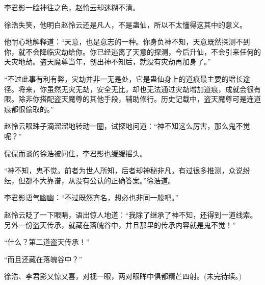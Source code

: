 \begin{this_body}
李君影一脸神往之色，赵怜云却迷糊不清。

徐浩失笑，他明白赵怜云还是凡人，不是蛊仙，所以不太懂得这其中的意义。

他耐心地解释道：“天意，也是意志的一种。你身负神不知，天意既然探测不到你，就不会降临灾劫给你。你已经逃离了天意的探测，今后升仙，不会引来任何的天灾地劫。盗天魔尊当年，创出神不知后，就没有灾劫再加身了。”

“不过此事有利有弊，灾劫并非一无是处，它是蛊仙身上的道痕最主要的增长途径。将来，你虽然无灾无劫，安全无比，却也无法通过灾劫增加道痕，成就会很有限。除非你搭配盗天魔尊的其他手段，辅助修行。历史记载中，盗天魔尊可是连道痕都很偷取的。”

赵怜云眼珠子滴溜溜地转动一圈，试探地问道：“神不知这么厉害，那么鬼不觉呢？”

侃侃而谈的徐浩被问住，李君影也缓缓摇头。

“神不知，鬼不觉。前者为世人所知，后者却神秘非凡。有过很多推测，众说纷纭，但都不大靠谱，从没有公认的正确答案。”徐浩道。

李君影语气幽幽：“不过既然齐名，想必也非同一般吧。”

赵怜云眨了一下眼睛，语出惊人地道：“我除了继承了神不知，还得到一道线索。另外一份盗天传承，就藏在落魄谷中，并且那里的传承内容就是鬼不觉！”

“什么？第二道盗天传承！”

“而且还藏在落魄谷中？”

徐浩、李君影又惊又喜，对视一眼，两对眼眸中俱都精芒四射。(未完待续。)

\end{this_body}

